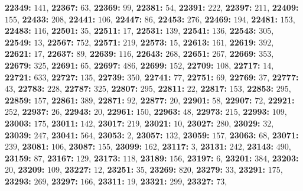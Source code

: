 \textsf{\bfseries 22349:} $141$, \textsf{\bfseries 22367:} $63$, \textsf{\bfseries 22369:} $99$, \textsf{\bfseries 22381:} $54$, \textsf{\bfseries 22391:} $222$, \textsf{\bfseries 22397:} $211$, \textsf{\bfseries 22409:} $155$, \textsf{\bfseries 22433:} $208$, \textsf{\bfseries 22441:} $106$, \textsf{\bfseries 22447:} $86$, \textsf{\bfseries 22453:} $276$, \textsf{\bfseries 22469:} $194$, \textsf{\bfseries 22481:} $153$, \textsf{\bfseries 22483:} $116$, \textsf{\bfseries 22501:} $35$, \textsf{\bfseries 22511:} $17$, \textsf{\bfseries 22531:} $139$, \textsf{\bfseries 22541:} $136$, \textsf{\bfseries 22543:} $305$, \textsf{\bfseries 22549:} $13$, \textsf{\bfseries 22567:} $752$, \textsf{\bfseries 22571:} $219$, \textsf{\bfseries 22573:} $15$, \textsf{\bfseries 22613:} $161$, \textsf{\bfseries 22619:} $392$, \textsf{\bfseries 22621:} $17$, \textsf{\bfseries 22637:} $89$, \textsf{\bfseries 22639:} $116$, \textsf{\bfseries 22643:} $268$, \textsf{\bfseries 22651:} $267$, \textsf{\bfseries 22669:} $353$, \textsf{\bfseries 22679:} $325$, \textsf{\bfseries 22691:} $65$, \textsf{\bfseries 22697:} $486$, \textsf{\bfseries 22699:} $152$, \textsf{\bfseries 22709:} $108$, \textsf{\bfseries 22717:} $14$, \textsf{\bfseries 22721:} $633$, \textsf{\bfseries 22727:} $135$, \textsf{\bfseries 22739:} $350$, \textsf{\bfseries 22741:} $77$, \textsf{\bfseries 22751:} $69$, \textsf{\bfseries 22769:} $37$, \textsf{\bfseries 22777:} $43$, \textsf{\bfseries 22783:} $228$, \textsf{\bfseries 22787:} $325$, \textsf{\bfseries 22807:} $295$, \textsf{\bfseries 22811:} $22$, \textsf{\bfseries 22817:} $153$, \textsf{\bfseries 22853:} $295$, \textsf{\bfseries 22859:} $157$, \textsf{\bfseries 22861:} $389$, \textsf{\bfseries 22871:} $92$, \textsf{\bfseries 22877:} $20$, \textsf{\bfseries 22901:} $58$, \textsf{\bfseries 22907:} $72$, \textsf{\bfseries 22921:} $252$, \textsf{\bfseries 22937:} $26$, \textsf{\bfseries 22943:} $20$, \textsf{\bfseries 22961:} $150$, \textsf{\bfseries 22963:} $48$, \textsf{\bfseries 22973:} $215$, \textsf{\bfseries 22993:} $109$, \textsf{\bfseries 23003:} $175$, \textsf{\bfseries 23011:} $142$, \textsf{\bfseries 23017:} $219$, \textsf{\bfseries 23021:} $10$, \textsf{\bfseries 23027:} $280$, \textsf{\bfseries 23029:} $32$, \textsf{\bfseries 23039:} $247$, \textsf{\bfseries 23041:} $564$, \textsf{\bfseries 23053:} $2$, \textsf{\bfseries 23057:} $132$, \textsf{\bfseries 23059:} $157$, \textsf{\bfseries 23063:} $68$, \textsf{\bfseries 23071:} $239$, \textsf{\bfseries 23081:} $106$, \textsf{\bfseries 23087:} $155$, \textsf{\bfseries 23099:} $162$, \textsf{\bfseries 23117:} $3$, \textsf{\bfseries 23131:} $242$, \textsf{\bfseries 23143:} $490$, \textsf{\bfseries 23159:} $87$, \textsf{\bfseries 23167:} $129$, \textsf{\bfseries 23173:} $118$, \textsf{\bfseries 23189:} $156$, \textsf{\bfseries 23197:} $6$, \textsf{\bfseries 23201:} $384$, \textsf{\bfseries 23203:} $20$, \textsf{\bfseries 23209:} $109$, \textsf{\bfseries 23227:} $12$, \textsf{\bfseries 23251:} $35$, \textsf{\bfseries 23269:} $820$, \textsf{\bfseries 23279:} $33$, \textsf{\bfseries 23291:} $175$, \textsf{\bfseries 23293:} $269$, \textsf{\bfseries 23297:} $166$, \textsf{\bfseries 23311:} $19$, \textsf{\bfseries 23321:} $299$, \textsf{\bfseries 23327:} $73$, 
